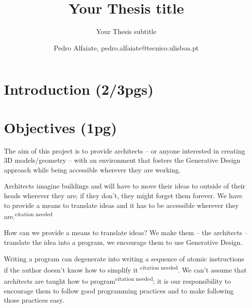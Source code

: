 \documentclass{./llncs2e/llncs}
\begin{document}
\title{Your Thesis title}

\subtitle{Your Thesis subtitle}
\author{Pedro Alfaiate, pedro.alfaiate@tecnico.ulisboa.pt}

\maketitle

\begin{abstract}

\end{abstract}
\begin{keywords}

\end{keywords}
\section{Introduction (2/3pgs)}

\section{Objectives (1pg)}
The aim of this project is to provide architects -- or anyone interested in creating 3D models/geometry -- with an environment that fosters the Generative Design approach while being accessible wherever they are working.

Architects imagine buildings and will have to move their ideas to outside of their heads wherever they are; if they don't, they might forget them forever. We have to provide a means to translate ideas and it has to be accessible wherever they are.\textsuperscript{citation needed}

How can we provide a means to translate ideas? We make them -- the architects -- translate the idea into a program, we encourage them to use Generative Design.

Writing a program can degenerate into writing a sequence of atomic instructions if the author doesn't know how to simplify it \textsuperscript{citation needed}. We can't assume that architects are taught how to program\textsuperscript{citation needed}; it is our responsibility to encourage them to follow good programming practices and to make following those practices easy.
\end{document}
